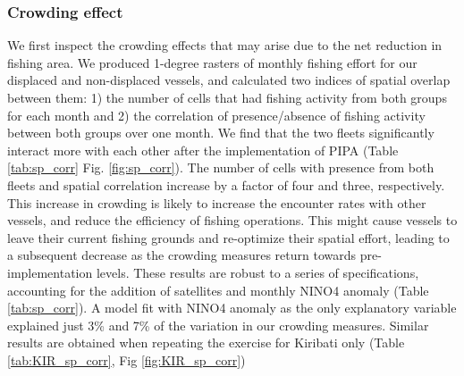 \documentclass[9p,twocolumn,twoside,lineno]{pnas-new}
\begin{document}
\subsubsection{Crowding effect}

We first inspect the crowding effects that may arise due to the net reduction in fishing area. We produced 1-degree rasters of monthly fishing effort for our displaced and non-displaced vessels, and calculated two indices of spatial overlap between them: 1) the number of cells that had fishing activity from both groups for each month and 2) the correlation of presence/absence of fishing activity between both groups over one month. We find that the two fleets significantly interact more with each other after the implementation of PIPA (Table \ref{tab:sp_corr} Fig. \ref{fig:sp_corr}). The number of cells with presence from both fleets and spatial correlation increase by a factor of four and three, respectively. This increase in crowding is likely to increase the encounter rates with other vessels, and reduce the efficiency of fishing operations. This might cause vessels to leave their current fishing grounds and re-optimize their spatial effort, leading to a subsequent decrease as the crowding measures return towards pre-implementation levels. These results are robust to a series of specifications, accounting for the addition of satellites and monthly NINO4 anomaly (Table \ref{tab:sp_corr}). A model fit with NINO4 anomaly as the only explanatory variable explained just 3\% and 7\% of the variation in our crowding measures. Similar results are obtained when repeating the exercise for Kiribati only (Table \ref{tab:KIR_sp_corr}, Fig \ref{fig:KIR_sp_corr})
\end{document}
